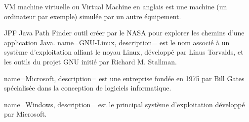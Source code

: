 


    {VM}
    {machine virtuelle}
    { ou Virtual Machine en anglais est une machine (un ordinateur par exemple) simulée par un autre équipement.}
    
    {JPF}
    {Java Path Finder}
    { outil créer par le NASA pour explorer les chemins d'une application Java.}
{
        name=GNU-Linux,
        description={ est le nom associé à un système d'exploitation alliant le noyau Linux, développé par Linus Torvalds, et les outils du projet GNU initié par Richard M. Stallman.}
}

{
        name=Microsoft,
        description={ est une entreprise fondée en 1975 par Bill Gates spécialisée dans la conception de logiciels informatique.}
}

{
        name=Windows,
        description={ est le principal système d'exploitation développé par Microsoft.}
}

